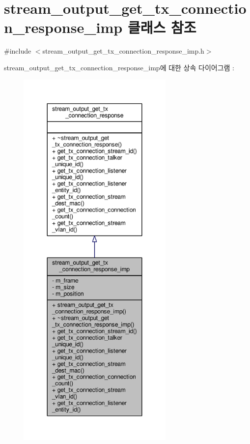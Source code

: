 \hypertarget{classavdecc__lib_1_1stream__output__get__tx__connection__response__imp}{}\section{stream\+\_\+output\+\_\+get\+\_\+tx\+\_\+connection\+\_\+response\+\_\+imp 클래스 참조}
\label{classavdecc__lib_1_1stream__output__get__tx__connection__response__imp}


{\ttfamily \#include $<$stream\+\_\+output\+\_\+get\+\_\+tx\+\_\+connection\+\_\+response\+\_\+imp.\+h$>$}



stream\+\_\+output\+\_\+get\+\_\+tx\+\_\+connection\+\_\+response\+\_\+imp에 대한 상속 다이어그램 \+: 
\nopagebreak
\begin{figure}[H]
\begin{center}
\leavevmode
\includegraphics[height=550pt]{classavdecc__lib_1_1stream__output__get__tx__connection__response__imp__inherit__graph}
\end{center}
\end{figure}


